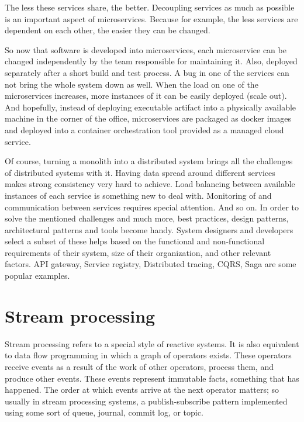 \documentclass[a4]{report}
\begin{document}
    The less these services share, the better.
    Decoupling services as much as possible is an important aspect of microservices.
    Because for example, the less services are dependent on each other, the easier they can be changed.

    So now that software is developed into microservices, each microservice can be changed independently by the team responsible for maintaining it. Also, deployed separately after a short build and test process.
    A bug in one of the services can not bring the whole system down as well.
    When the load on one of the microservices increases, more instances of it can be easily deployed (scale out).
    And hopefully, instead of deploying executable artifact into a physically available machine in the corner of the office, microservices are packaged as docker\cite{pro-docker} images and deployed into a container orchestration tool provided as a managed cloud service.

    Of course, turning a monolith into a distributed system brings all the challenges of distributed systems with it.
    Having data spread around different services makes strong consistency very hard to achieve.
    Load balancing between available instances of each service is something new to deal with.
    Monitoring of and communication between services requires special attention.
    And so on.
    In order to solve the mentioned challenges and much more, best practices, design patterns, architectural patterns
    and tools become handy.
    System designers and developers select a subset of these helps based on the functional and non-functional
    requirements of their system, size of their organization, and other relevant factors.
    API gateway, Service registry, Distributed tracing, CQRS, Saga are some popular examples.
    \cite{microservice-architecture} \cite{microservices-pitfalls} \cite{microservices}


    \section{Stream processing}
    Stream processing refers to a special style of reactive systems.
    It is also equivalent to data flow programming in which a graph of operators exists.
    These operators receive events as a result of the work of other operators, process them, and produce other events.
    These events represent immutable facts, something that has happened.
    The order at which events arrive at the next operator matters;
    so usually in stream processing systems, a publish-subscribe pattern implemented using some sort of queue,
    journal, commit log, or topic.
    \cite{flink} \cite{fast-data-archs}
\end{document}
